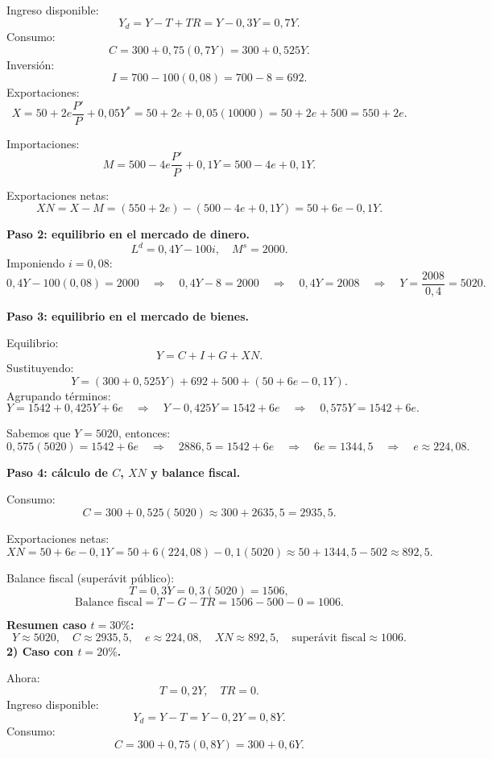 \documentclass[11pt,addpoints]{article}
\begin{document}
Ingreso disponible:
\[
Y_d = Y - T + TR = Y - 0{,}3Y = 0{,}7Y.
\]
Consumo:
\[
C = 300 + 0{,}75(0{,}7Y) = 300 + 0{,}525Y.
\]
Inversión:
\[
I = 700 - 100(0{,}08) = 700 - 8 = 692.
\]
\newpage
\vspace*{0.5cm}
Exportaciones:
\[
X = 50 + 2e\frac{P'}{P} + 0{,}05Y^*
= 50 + 2e + 0{,}05(10000)
= 50 + 2e + 500 = 550 + 2e.
\]

Importaciones:
\[
M = 500 - 4e\frac{P'}{P} + 0{,}1Y
= 500 - 4e + 0{,}1Y.
\]

Exportaciones netas:
\[
XN = X - M
= (550 + 2e) - (500 - 4e + 0{,}1Y)
= 50 + 6e - 0{,}1Y.
\]

\textbf{Paso 2: equilibrio en el mercado de dinero.}
\[
L^d = 0{,}4Y - 100i, \quad M^s = 2000.
\]
Imponiendo $i = 0{,}08$:
\[
0{,}4Y - 100(0{,}08) = 2000
\quad\Rightarrow\quad
0{,}4Y - 8 = 2000
\quad\Rightarrow\quad
0{,}4Y = 2008
\quad\Rightarrow\quad
Y = \frac{2008}{0{,}4} = 5020.
\]

\textbf{Paso 3: equilibrio en el mercado de bienes.}

Equilibrio:
\[
Y = C + I + G + XN.
\]
Sustituyendo:
\[
Y = (300 + 0{,}525Y) + 692 + 500 + (50 + 6e - 0{,}1Y).
\]
Agrupando términos:
\[
Y = 1542 + 0{,}425Y + 6e
\quad\Rightarrow\quad
Y - 0{,}425Y = 1542 + 6e
\quad\Rightarrow\quad
0{,}575Y = 1542 + 6e.
\]

Sabemos que $Y = 5020$, entonces:
\[
0{,}575(5020) = 1542 + 6e
\quad\Rightarrow\quad
2886{,}5 = 1542 + 6e
\quad\Rightarrow\quad
6e = 1344{,}5
\quad\Rightarrow\quad
e \approx 224{,}08.
\]

\textbf{Paso 4: cálculo de $C$, $XN$ y balance fiscal.}

Consumo:
\[
C = 300 + 0{,}525(5020) \approx 300 + 2635{,}5 = 2935{,}5.
\]

Exportaciones netas:
\[
XN = 50 + 6e - 0{,}1Y
= 50 + 6(224{,}08) - 0{,}1(5020)
\approx 50 + 1344{,}5 - 502
\approx 892{,}5.
\]

Balance fiscal (superávit público):
\[
T = 0{,}3Y = 0{,}3(5020) = 1506,
\]
\[
\text{Balance fiscal} = T - G - TR = 1506 - 500 - 0 = 1006.
\]

\textbf{Resumen caso $t=30\%$:}
\[
Y \approx 5020, \quad
C \approx 2935{,}5, \quad
e \approx 224{,}08, \quad
XN \approx 892{,}5, \quad
\text{superávit fiscal} \approx 1006.
\]
\newpage
\vspace*{0.5cm}
\textbf{2) Caso con $t = 20\%$.}

Ahora:
\[
T = 0{,}2Y, \quad TR = 0.
\]
Ingreso disponible:
\[
Y_d = Y - T = Y - 0{,}2Y = 0{,}8Y.
\]
Consumo:
\[
C = 300 + 0{,}75(0{,}8Y) = 300 + 0{,}6Y.
\]
\end{document}
